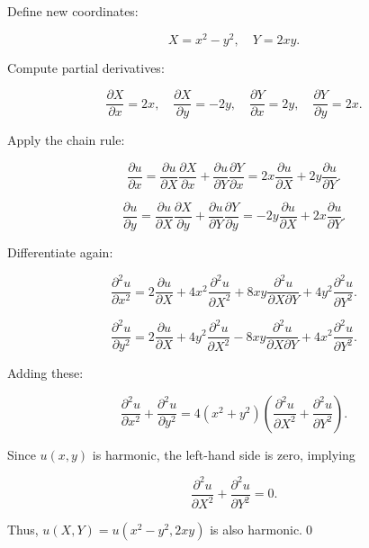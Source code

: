 \documentclass{article}
\begin{document}
\begin{itemize}
Define new coordinates:

\[
X = x^2 - y^2, \quad Y = 2xy.
\]

Compute partial derivatives:

\[
\frac{\partial X}{\partial x} = 2x, \quad \frac{\partial X}{\partial y} = -2y, \quad \frac{\partial Y}{\partial x} = 2y, \quad \frac{\partial Y}{\partial y} = 2x.
\]

Apply the chain rule:

\[
\frac{\partial u}{\partial x} = \frac{\partial u}{\partial X} \frac{\partial X}{\partial x} + \frac{\partial u}{\partial Y} \frac{\partial Y}{\partial x} = 2x \frac{\partial u}{\partial X} + 2y \frac{\partial u}{\partial Y}.
\]

\[
\frac{\partial u}{\partial y} = \frac{\partial u}{\partial X} \frac{\partial X}{\partial y} + \frac{\partial u}{\partial Y} \frac{\partial Y}{\partial y} = -2y \frac{\partial u}{\partial X} + 2x \frac{\partial u}{\partial Y}.
\]

Differentiate again:

\[
\frac{\partial^2 u}{\partial x^2} = 2 \frac{\partial u}{\partial X} + 4x^2 \frac{\partial^2 u}{\partial X^2} + 8xy \frac{\partial^2 u}{\partial X \partial Y} + 4y^2 \frac{\partial^2 u}{\partial Y^2}.
\]

\[
\frac{\partial^2 u}{\partial y^2} = 2 \frac{\partial u}{\partial X} + 4y^2 \frac{\partial^2 u}{\partial X^2} - 8xy \frac{\partial^2 u}{\partial X \partial Y} + 4x^2 \frac{\partial^2 u}{\partial Y^2}.
\]

Adding these:

\[
\frac{\partial^2 u}{\partial x^2} + \frac{\partial^2 u}{\partial y^2} = 4(x^2 + y^2) \left( \frac{\partial^2 u}{\partial X^2} + \frac{\partial^2 u}{\partial Y^2} \right).
\]

Since \( u(x,y) \) is harmonic, the left-hand side is zero, implying

\[
\frac{\partial^2 u}{\partial X^2} + \frac{\partial^2 u}{\partial Y^2} = 0.
\]

Thus, \( u(X, Y) = u(x^2 - y^2, 2xy) \) is also harmonic.\qed

\end{itemize}
\newpage
\end{document}
